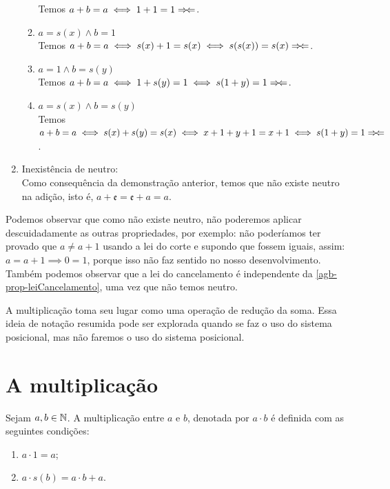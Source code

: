 \documentclass[../main.tex]{subfiles}
\begin{document}
\begin{dem}
\begin{enumerate}[label=(\roman*)]
\begin{enumerate}[label=(\arabic*)]
                Temos $a+b=a \iff 1+1=1 \Rightarrow\!\Leftarrow$. 
            \item $a=s(x) \land b=1$ \\
                Temos $a+b=a \iff s(x) + 1 = s(x) \iff s(s(x)) = s(x) \Rightarrow\!\Leftarrow$. 
            \item $a=1 \land b=s(y)$ \\
                Temos $a+b=a \iff 1+ s(y) = 1 \iff s(1+y) = 1 \Rightarrow\!\Leftarrow$. 
            \item $a=s(x) \land b=s(y)$ \\
                Temos $a+b=a \iff s(x) + s(y) = s(x) \iff x + 1 + y + 1 = x + 1 \iff s(1 + y) = 1 \Rightarrow\!\Leftarrow$.
            \end{enumerate}
    
        \item Inexistência de neutro: \\
            Como consequência da demonstração anterior, temos que não existe neutro na adição, isto é, $a + \mathfrak{e} = \mathfrak{e} + a = a$.
    \end{enumerate}
\end{dem}
 
Podemos observar que como não existe neutro, não poderemos aplicar descuidadamente as outras propriedades, por exemplo: não poderíamos ter provado que $a \neq a + 1 $ usando a lei do corte e supondo que fossem iguais, assim: $a = a+ 1 \implies 0 = 1$, porque isso não faz sentido no nosso desenvolvimento. Também podemos observar que a lei do cancelamento é independente da \cref{agb-prop-leiCancelamento}, uma vez que não temos neutro.

A multiplicação toma seu lugar como uma operação de redução da soma. Essa ideia de notação resumida pode ser explorada quando se faz o uso do sistema posicional, mas não faremos o uso do sistema posicional. 

\section{A multiplicação}
\begin{defi}\label{nat-def-multiplicacao}
    Sejam $a, b \in \mathbb{N}$. A multiplicação entre $a$ e $b$, denotada por $a \cdot b$ é definida com as seguintes condições: 
	\begin{enumerate}[label=(\roman*)]
		\item $a \cdot 1 = a$;
		\item $a \cdot s(b) = a \cdot b + a$.
	\end{enumerate}
\end{defi}
\end{document}

